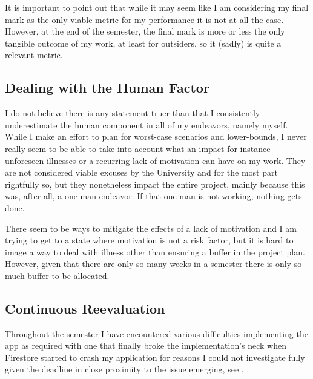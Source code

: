 \documentclass[11pt,a4paper,notitlepage]{article}
\begin{document}
    It is important to point out that while it may seem like I am considering my final mark as the only viable metric for my performance it is not at all the case. However, at the end of the semester, the final mark is more or less the only tangible outcome of my work, at least for outsiders, so it (sadly) is quite a relevant metric.

\subsection{Dealing with the Human Factor}

    I do not believe there is any statement truer than that I consistently underestimate the human component in all of my endeavors, namely myself. While I make an effort to plan for worst-case scenarios and lower-bounds, I never really seem to be able to take into account what an impact for instance unforeseen illnesses or a recurring lack of motivation can have on my work. They are not considered viable excuses by the University and for the most part rightfully so, but they nonetheless impact the entire project, mainly because this was, after all, a one-man endeavor. If that one man is not working, nothing gets done.

    There seem to be ways to mitigate the effects of a lack of motivation and I am trying to get to a state where motivation is not a risk factor, but it is hard to image a way to deal with illness other than ensuring a buffer in the project plan. However, given that there are only so many weeks in a semester there is only so much buffer to be allocated.

\subsection{Continuous Reevaluation}

    Throughout the semester I have encountered various difficulties implementing the app as required with one that finally broke the implementation's neck when Firestore started to crash my application for reasons I could not investigate fully given the deadline in close proximity to the issue emerging, see \cite{firestore-issue}.
\end{document}
